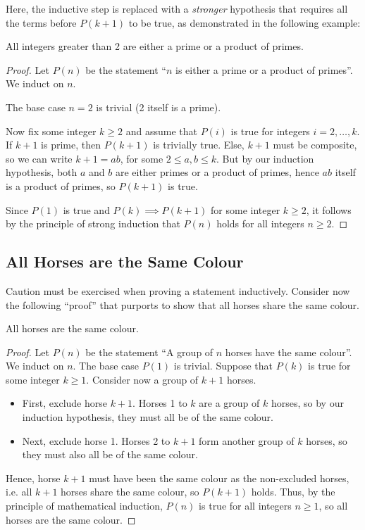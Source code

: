 Here, the inductive step is replaced with a \emph{stronger} hypothesis that requires all the terms before $P(k+1)$ to be true, as demonstrated in the following example:

\begin{statement}
    All integers greater than 2 are either a prime or a product of primes.
\end{statement}
\begin{proof}
    Let $P(n)$ be the statement ``$n$ is either a prime or a product of primes''. We induct on $n$.
    
    The base case $n = 2$ is trivial (2 itself is a prime).
    
    Now fix some integer $k \geq 2$ and assume that $P(i)$ is true for integers $i = 2, \dots, k$. If $k+1$ is prime, then $P(k+1)$ is trivially true. Else, $k+1$ must be composite, so we can write $k+1 = ab$, for some $2 \leq a, b \leq k$. But by our induction hypothesis, both $a$ and $b$ are either primes or a product of primes, hence $ab$ itself is a product of primes, so $P(k+1)$ is true. 
    
    Since $P(1)$ is true and $P(k) \implies P(k+1)$ for some integer $k \geq 2$, it follows by the principle of strong induction that $P(n)$ holds for all integers $n \geq 2$.
\end{proof}

\subsection{All Horses are the Same Colour}

Caution must be exercised when proving a statement inductively. Consider now the following ``proof'' that purports to show that all horses share the same colour.

\begin{statement}
    All horses are the same colour.
\end{statement}
\begin{proof}
    Let $P(n)$ be the statement ``A group of $n$ horses have the same colour''. We induct on $n$. The base case $P(1)$ is trivial. Suppose that $P(k)$ is true for some integer $k \geq 1$. Consider now a group of $k+1$ horses.
    \begin{itemize}
        \item First, exclude horse $k+1$. Horses 1 to $k$ are a group of $k$ horses, so by our induction hypothesis, they must all be of the same colour.
        \item Next, exclude horse 1. Horses 2 to $k+1$ form another group of $k$ horses, so they must also all be of the same colour.
    \end{itemize}
    Hence, horse $k+1$ must have been the same colour as the non-excluded horses, i.e. all $k+1$ horses share the same colour, so $P(k+1)$ holds. Thus, by the principle of mathematical induction, $P(n)$ is true for all integers $n \geq 1$, so all horses are the same colour.
\end{proof}

